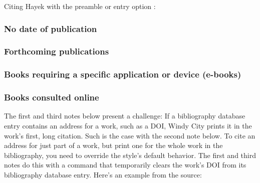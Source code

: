 \documentclass[11pt,letterpaper,oneside]{article}
\begin{document}
\noindent Citing Hayek with the preamble or entry option
:

\begin{citebib}
\item \cite*[329]{hayek2011}
\end{citebib}

\subsubsection{No date of publication}

\begin{bibonly}
\nocite{boston,edinburgh1750,edinburgh}
\end{bibonly}

\subsubsection{Forthcoming publications}
\label{14.146}

\begin{citebib}
\item \cite{author}
\item \cite[345--46]{writer}
\item \cite{contributor}
\end{citebib}

\setcounter{subsubsection}{158}
\subsubsection{Books requiring a specific application or device (e-books)}

\begin{citebib}
\item \cite{borel2015}
\end{citebib}

\setcounter{subsubsection}{160}
\subsubsection{Books consulted online}

The first and third notes below present a challenge: If a bibliography
database entry contains an address for a work, such as a DOI, Windy
City prints it in the work's first, long citation. Such is the case
with the second note below. To cite an address for just part of a
work, but print one for the whole work in the bibliography, you need
to override the style's default behavior. The first and third notes do
this with a command that temporarily clears the work's DOI from its
bibliography database entry. Here's an example from the source:
\end{document}
